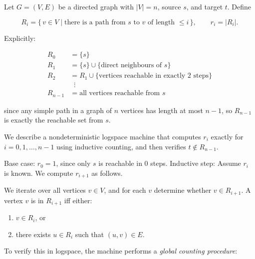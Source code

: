 \documentclass[12pt,a4paper,openany]{article}
\begin{document}
Let $G=(V,E)$ be a directed graph with $|V|=n$, source $s$, and target $t$. Define

\[
R_i = \{\, v \in V \mid \text{there is a path from } s \text{ to } v \text{ of length } \le i \,\}, 
\qquad r_i = |R_i|.
\]

Explicitly:

\begin{align*}
R_0 &= \{s\} \\
R_1 &= \{s\} \cup \{\text{direct neighbours of } s\} \\
R_2 &= R_1 \cup \{\text{vertices reachable in exactly 2 steps}\} \\
    &\;\;\vdots \\
R_{n-1} &= \text{all vertices reachable from } s
\end{align*}

since any simple path in a graph of $n$ vertices has length at most $n-1$,
so $R_{n-1}$ is exactly the reachable set from $s$.

We describe a nondeterministic logspace machine that computes $r_i$ exactly for
$i=0,1,\dots,n-1$ using inductive counting, and then verifies $t \notin R_{n-1}$.

Base case: $r_0 = 1$, since only $s$ is reachable in $0$ steps.
Inductive step: Assume $r_i$ is known. We compute $r_{i+1}$ as follows.

We iterate over all vertices $v \in V$, and for each $v$ determine whether $v \in R_{i+1}$.
A vertex $v$ is in $R_{i+1}$ iff either:

\begin{enumerate}
    \item $v \in R_i$, or
    \item there exists $u \in R_i$ such that $(u,v) \in E$.
\end{enumerate}

To verify this in logspace, the machine performs a \emph{global counting procedure}:
\end{document}
